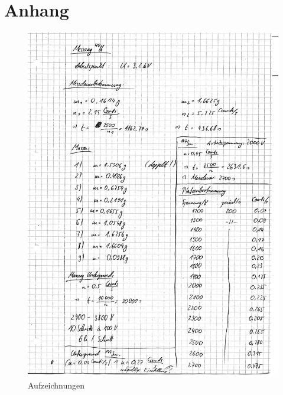 \clearpage
\section{Anhang}
\begin{figure}[h]
\begin{center}
\includegraphics[scale=0.6]{Bilder/anhang_lhwz}
\caption{Aufzeichnungen}
\end{center}
\end{figure}